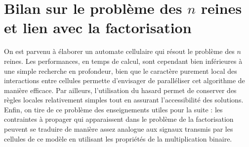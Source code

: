 



\section{Bilan sur le problème des $n$ reines et lien avec la factorisation}



On est parvenu à élaborer un automate cellulaire qui résout le problème des $n$ reines. Les performances, en temps de calcul, sont cependant  bien inférieures à une simple recherche en profondeur, bien que le caractère purement local des interactions entre cellules permette d'envisager de paralléliser cet algorithme de manière efficace. Par ailleurs, l'utilisation du hasard permet de conserver des règles locales relativement simples tout en assurant l'accessibilité des solutions. Enfin, on tire de ce problème des enseignements utiles pour la suite : les con\-train\-tes à propager qui apparaissent dans le problème de la factorisation  peuvent se traduire de manière assez analogue aux signaux transmis par les cellules de ce modèle en utilisant les propriétés de la multiplication binaire.


